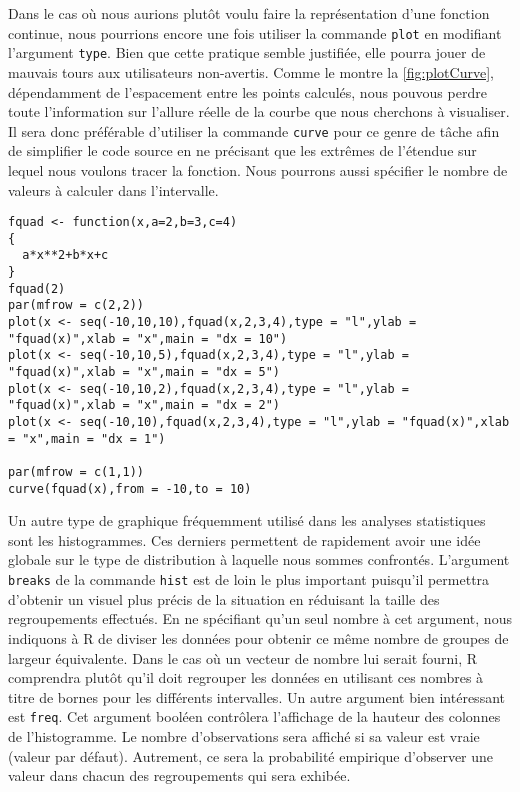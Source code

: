 \vspace{\baselineskip}
Dans le cas où nous aurions plutôt voulu faire la représentation d'une fonction continue, nous pourrions encore une fois utiliser la commande \texttt{plot} en modifiant l'argument \texttt{type}. Bien que cette pratique semble justifiée, elle pourra jouer de mauvais tours aux utilisateurs non-avertis. Comme le montre la \autoref{fig:plotCurve}, dépendamment de l'espacement entre les points calculés, nous pouvous perdre toute l'information sur l'allure réelle de la courbe que nous cherchons à visualiser. \\

Il sera donc préférable d'utiliser la commande \texttt{curve} \cite{Rfunction:curve} pour ce genre de tâche afin de simplifier le code source en ne précisant que les extrêmes de l'étendue sur lequel nous voulons tracer la fonction. Nous pourrons aussi spécifier le nombre de valeurs à calculer dans l'intervalle. \\

\begin{lstlisting}[caption = Utilisation de la commande \texttt{curve},label=src:plotCurve]
fquad <- function(x,a=2,b=3,c=4)
{
  a*x**2+b*x+c
}
fquad(2)
par(mfrow = c(2,2))
plot(x <- seq(-10,10,10),fquad(x,2,3,4),type = "l",ylab = "fquad(x)",xlab = "x",main = "dx = 10")
plot(x <- seq(-10,10,5),fquad(x,2,3,4),type = "l",ylab = "fquad(x)",xlab = "x",main = "dx = 5")
plot(x <- seq(-10,10,2),fquad(x,2,3,4),type = "l",ylab = "fquad(x)",xlab = "x",main = "dx = 2")
plot(x <- seq(-10,10),fquad(x,2,3,4),type = "l",ylab = "fquad(x)",xlab = "x",main = "dx = 1")

par(mfrow = c(1,1))
curve(fquad(x),from = -10,to = 10)
\end{lstlisting}



\vspace{\baselineskip}
Un autre type de graphique fréquemment utilisé dans les analyses statistiques sont les histogrammes. Ces derniers permettent de rapidement avoir une idée globale sur le type de distribution à laquelle nous sommes confrontés. L'argument \texttt{breaks} de la commande \texttt{hist} \cite{Rfunction:hist} est de loin le plus important puisqu'il permettra d'obtenir un visuel plus précis de la situation en réduisant la taille des regroupements effectués. En ne spécifiant qu'un seul nombre à cet argument, nous indiquons à R de diviser les données pour obtenir ce même nombre de groupes de largeur équivalente. Dans le cas où un vecteur de nombre lui serait fourni, R comprendra plutôt qu'il doit regrouper les données en utilisant ces nombres à titre de bornes pour les différents intervalles. Un autre argument bien intéressant est \texttt{freq}. Cet argument booléen contrôlera l'affichage de la hauteur des colonnes de l'histogramme. Le nombre d'observations sera affiché si sa valeur est vraie (valeur par défaut). Autrement, ce sera la probabilité empirique d'observer une valeur dans chacun des regroupements qui sera exhibée. \\

